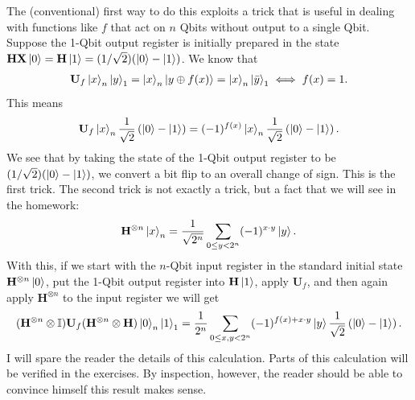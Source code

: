 \documentclass{book}
\theoremstyle{definition}
\newcommand{\X}{\mathbf{X}}
\newcommand{\f}[2]{\frac{#1}{#2}}
\newcommand{\lp}{\left(}
\newcommand{\rp}{\right)}
\newcommand{\U}{\mathbf{U}}
\newcommand{\Id}{\mathbb{I}}
\newcommand{\had}{\mathbf{H}}
\begin{document}
The (conventional) first way to do this exploits a trick that is useful in dealing with functions like $f$ that act on $n$ Qbits without output to a single Qbit. Suppose the 1-Qbit output register is initially prepared in the state $\had \X \ket{0} = \had\ket{1} = (1/\sqrt{2})(\ket{0} - \ket{1})$. We know that 
\begin{align}
\U_f \ket{x}_n\ket{y}_1 = \ket{x}_n\ket{y\oplus f(x)}  = \ket{x}_n\ket{\bar{y}}_1 \iff f(x) = 1.
\end{align} 
This means
\begin{align}
\U_f \ket{x}_n\f{1}{\sqrt{2}}\lp \ket{0} - \ket{1} \rp = (-1)^{f(x)}\ket{x}_n \f{1}{\sqrt{2}}\lp \ket{0} - \ket{1} \rp.
\end{align}
We see that by taking the state of the 1-Qbit output register to be $(1/\sqrt{2})(\ket{0} - \ket{1})$, we convert a bit flip to an overall change of sign. This is the first trick. The second trick is not exactly a trick, but a fact that we will see in the homework:
\begin{align}
\had^{\otimes n}\ket{x}_n = \f{1}{\sqrt{2^n}} \sum_{0\leq y < 2^n}(-1)^{x\cdot y}\ket{y}.
\end{align}
With this, if we start with the $n$-Qbit input register in the standard initial state $\had^{\otimes n}\ket{0}$, put the 1-Qbit output register into $\had\ket{1}$, apply $\U_f$, and then again apply $\had^{\otimes n}$ to the input register we will get
\begin{align}
(\had^{\otimes n} \otimes \Id)\U_f(\had^{\otimes n} \otimes \had)\ket{0}_n\ket{1}_1 = \f{1}{2^n}\sum_{0\leq x,y< 2^n}(-1)^{f(x)+x\cdot y}\ket{y}\f{1}{\sqrt{2}}\lp \ket{0} - \ket{1} \rp.
\end{align}
I will spare the reader the details of this calculation. Parts of this calculation will be verified in the exercises. By inspection, however, the reader should be able to convince himself this result makes sense. \\
\end{document}
